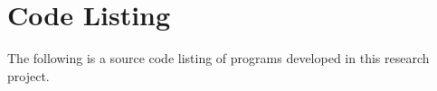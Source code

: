 \chapter{Code Listing}

The following is a source code listing of programs
developed in this research project.
